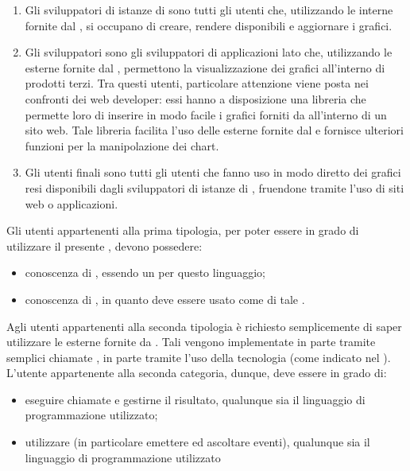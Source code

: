 		\begin{enumerate}
			\item Gli sviluppatori di istanze di  sono tutti gli utenti che, utilizzando le  interne fornite dal , si occupano di creare, rendere disponibili e aggiornare i grafici.
			\item Gli sviluppatori  sono gli sviluppatori di applicazioni lato  che, utilizzando le  esterne fornite dal , permettono la visualizzazione dei grafici all'interno di prodotti terzi. Tra questi utenti, particolare attenzione viene posta nei confronti dei web developer: essi hanno a disposizione una libreria che permette loro di inserire in modo facile i grafici forniti da  all'interno di un sito web. Tale libreria facilita l'uso delle  esterne fornite dal  e fornisce ulteriori funzioni per la manipolazione dei chart.
			\item Gli utenti finali sono tutti gli utenti che fanno uso in modo diretto dei grafici resi disponibili dagli sviluppatori di istanze di , fruendone tramite l'uso di siti web o applicazioni.
		\end{enumerate}
		Gli utenti appartenenti alla prima tipologia, per poter essere in grado di utilizzare il presente , devono possedere:
		\begin{itemize}
			\item conoscenza di , essendo  un  per questo linguaggio;
			\item conoscenza di , in quanto  deve essere usato come  di tale .
		\end{itemize}
		Agli utenti appartenenti alla seconda tipologia è richiesto semplicemente di saper utilizzare le  esterne fornite da . Tali  vengono implementate in parte tramite semplici chiamate , in parte tramite l'uso della tecnologia  (come indicato nel ). L'utente appartenente alla seconda categoria, dunque, deve essere in grado di:
		\begin{itemize}
			\item eseguire chiamate  e gestirne il risultato, qualunque sia il linguaggio di programmazione utilizzato;
			\item utilizzare  (in particolare emettere ed ascoltare eventi), qualunque sia il linguaggio di programmazione utilizzato
		\end{itemize}
